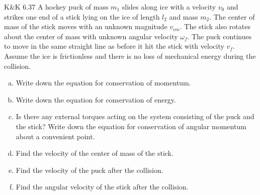 \documentclass{esg8012pset}
\begin{document}
\begin{problem}{K\&K 6.37}
  A hockey puck of mass $m_1$ slides along ice with a velocity $v_0$ and strikes one end of a stick lying on the ice of length $l_2$ and mass $m_2$. The center of mass of the stick moves with an unknown magnitude $v_{cm}$. The stick also rotates about the center of mass with unknown angular velocity $\omega_{f}$. The puck continues to move in the same straight line as before it hit the stick with velocity $v_f$. Assume the ice is frictionless and there is no loss of mechanical energy during the collision.
  \begin{center}
  \end{center}
  \begin{enumerate}[(a)]
    \item Write down the equation for conservation of momentum.
    \item Write down the equation for conservation of energy.
    \item Is there any external torques acting on the system consisting of the puck and the stick? Write down the equation for conservation of angular momentum about a convenient point.
    \item Find the velocity of the center of mass of the stick.
    \item Find the velocity of the puck after the collision.
    \item Find the angular velocity of the stick after the collision.
  \end{enumerate}
\end{problem}
\end{document}
